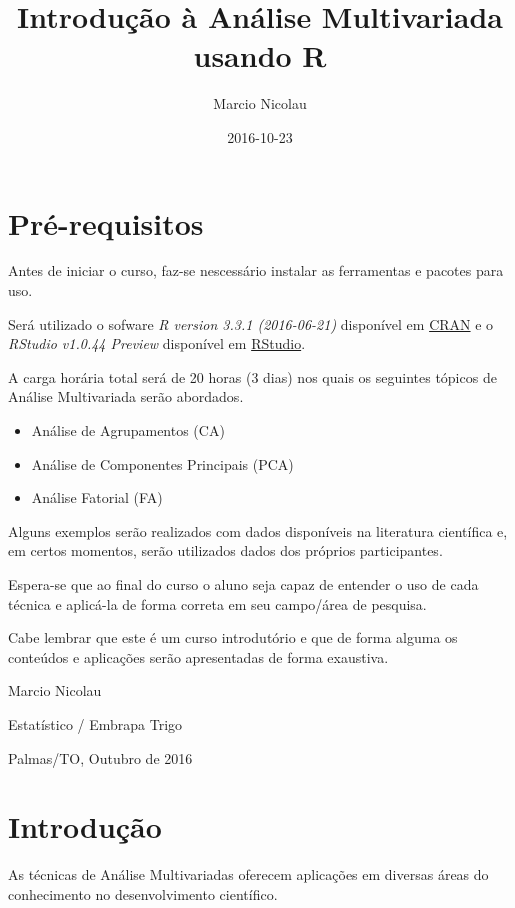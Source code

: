 \documentclass[]{book}
\title{Introdução à Análise Multivariada usando R}
\author{Marcio Nicolau}
\date{2016-10-23}
\providecommand{\tightlist}{%
  \setlength{\itemsep}{0pt}\setlength{\parskip}{0pt}}
\begin{document}
\maketitle

{
\setcounter{tocdepth}{1}
\tableofcontents
}
\chapter{Pré-requisitos}\label{pre-requisitos}

Antes de iniciar o curso, faz-se nescessário instalar as ferramentas e
pacotes para uso.

Será utilizado o sofware \emph{R version 3.3.1 (2016-06-21)} disponível
em \href{https://cran.r-project.org}{CRAN} e o \emph{RStudio v1.0.44
Preview} disponível em
\href{https://www.rstudio.com/products/rstudio/download/preview/}{RStudio}.

A carga horária total será de 20 horas (3 dias) nos quais os seguintes
tópicos de Análise Multivariada serão abordados.

\begin{itemize}
\tightlist
\item
  Análise de Agrupamentos (CA)
\item
  Análise de Componentes Principais (PCA)
\item
  Análise Fatorial (FA)
\end{itemize}

Alguns exemplos serão realizados com dados disponíveis na literatura
científica e, em certos momentos, serão utilizados dados dos próprios
participantes.

Espera-se que ao final do curso o aluno seja capaz de entender o uso de
cada técnica e aplicá-la de forma correta em seu campo/área de pesquisa.

Cabe lembrar que este é um curso introdutório e que de forma alguma os
conteúdos e aplicações serão apresentadas de forma exaustiva.

Marcio Nicolau

Estatístico / Embrapa Trigo

Palmas/TO, Outubro de 2016

\chapter{Introdução}\label{intro}

As técnicas de Análise Multivariadas oferecem aplicações em diversas
áreas do conhecimento no desenvolvimento científico.
\end{document}
